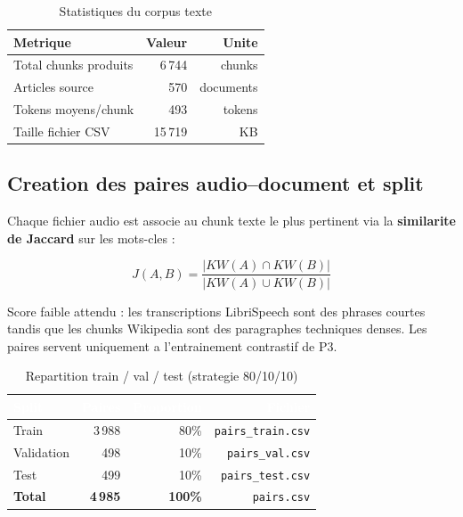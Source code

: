 \documentclass[12pt, a4paper]{article}
\begin{document}
\begin{table}[H]
\centering
\caption{Statistiques du corpus texte}
\begin{tabular}{lrr}
\toprule
\textbf{Metrique} & \textbf{Valeur} & \textbf{Unite} \\
\midrule
Total chunks produits  & 6\,744  & chunks \\
\rowcolor{silver}
Articles source        & 570     & documents \\
Tokens moyens/chunk    & 493     & tokens \\
\rowcolor{silver}
Taille fichier CSV     & 15\,719 & KB \\
\bottomrule
\end{tabular}
\end{table}

\subsection{Creation des paires audio--document et split}

Chaque fichier audio est associe au chunk texte le plus pertinent via la
\textbf{similarite de Jaccard} sur les mots-cles :

\begin{equation}
  J(A, B) = \frac{|KW(A) \cap KW(B)|}{|KW(A) \cup KW(B)|}
\end{equation}

\begin{infobox}
Score faible attendu : les transcriptions LibriSpeech sont des phrases courtes
tandis que les chunks Wikipedia sont des paragraphes techniques denses.
Les paires servent uniquement a l'entrainement contrastif de P3.
\end{infobox}

\begin{table}[H]
\centering
\caption{Repartition train / val / test (strategie 80/10/10)}
\begin{tabular}{lrrr}
\toprule
\rowcolor{navy}
\textcolor{white}{\textbf{Split}} &
\textcolor{white}{\textbf{Paires}} &
\textcolor{white}{\textbf{Proportion}} &
\textcolor{white}{\textbf{Fichier}} \\
\midrule
Train      & 3\,988 & 80\% & \texttt{pairs\_train.csv} \\
\rowcolor{silver}
Validation & 498    & 10\% & \texttt{pairs\_val.csv} \\
Test       & 499    & 10\% & \texttt{pairs\_test.csv} \\
\midrule
\rowcolor{silver}
\textbf{Total} & \textbf{4\,985} & \textbf{100\%} & \texttt{pairs.csv} \\
\bottomrule
\end{tabular}
\end{table}
\end{document}
